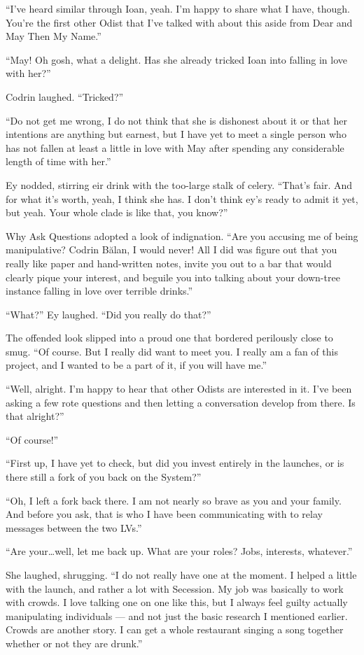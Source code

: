 ``I've heard similar through Ioan, yeah. I'm happy to share what I have, though. You're the first other Odist that I've talked with about this aside from Dear and May Then My Name.''

``May! Oh gosh, what a delight. Has she already tricked Ioan into falling in love with her?''

Codrin laughed. ``Tricked?''

``Do not get me wrong, I do not think that she is dishonest about it or that her intentions are anything but earnest, but I have yet to meet a single person who has not fallen at least a little in love with May after spending any considerable length of time with her.''

Ey nodded, stirring eir drink with the too-large stalk of celery. ``That's fair. And for what it's worth, yeah, I think she has. I don't think ey's ready to admit it yet, but yeah. Your whole clade is like that, you know?''

Why Ask Questions adopted a look of indignation. ``Are you accusing me of being manipulative? Codrin Bălan, I would never! All I did was figure out that you really like paper and hand-written notes, invite you out to a bar that would clearly pique your interest, and beguile you into talking about your down-tree instance falling in love over terrible drinks.''

``What?'' Ey laughed. ``Did you really do that?''

The offended look slipped into a proud one that bordered perilously close to smug. ``Of course. But I really did want to meet you. I really am a fan of this project, and I wanted to be a part of it, if you will have me.''

``Well, alright. I'm happy to hear that other Odists are interested in it. I've been asking a few rote questions and then letting a conversation develop from there. Is that alright?''

``Of course!''

``First up, I have yet to check, but did you invest entirely in the launches, or is there still a fork of you back on the System?''

``Oh, I left a fork back there. I am not nearly so brave as you and your family. And before you ask, that is who I have been communicating with to relay messages between the two LVs.''

``Are your\ldots well, let me back up. What are your roles? Jobs, interests, whatever.''

She laughed, shrugging. ``I do not really have one at the moment. I helped a little with the launch, and rather a lot with Secession. My job was basically to work with crowds. I love talking one on one like this, but I always feel guilty actually manipulating individuals — and not just the basic research I mentioned earlier. Crowds are another story. I can get a whole restaurant singing a song together whether or not they are drunk.''

